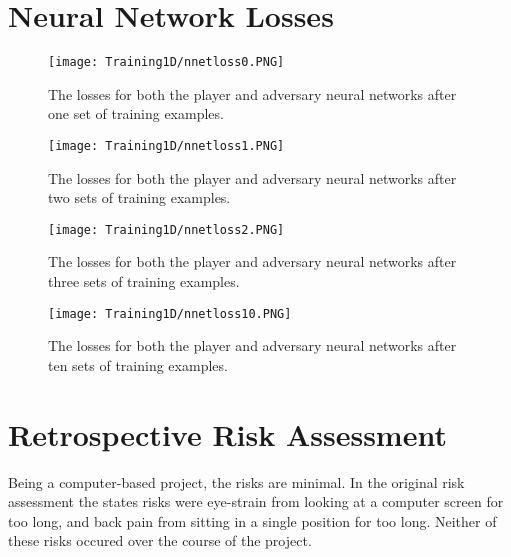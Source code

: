 \documentclass[../main.tex]{subfiles}
\begin{document}
{\section{Neural Network Losses}

\begin{figure}[h]
    \centering
    \texttt{[image: Training1D/nnetloss0.PNG]}
    \caption{The losses for both the player and adversary neural networks after one set of training examples.}
    \label{fig:nnetlosses0}
\end{figure}

\begin{figure}[h]
    \centering
    \texttt{[image: Training1D/nnetloss1.PNG]}
    \caption{The losses for both the player and adversary neural networks after two sets of training examples.}
    \label{fig:nnetlosses1}
\end{figure}

\begin{figure}[h]
    \centering
    \texttt{[image: Training1D/nnetloss2.PNG]}
    \caption{The losses for both the player and adversary neural networks after three sets of training examples.}
    \label{fig:nnetlosses2}
\end{figure}

\begin{figure}[h]
    \centering
    \texttt{[image: Training1D/nnetloss10.PNG]}
    \caption{The losses for both the player and adversary neural networks after ten sets of training examples.}
    \label{fig:nnetlosses10}
\end{figure}

\section{Retrospective Risk Assessment}

Being a computer-based project, the risks are minimal. In the original risk assessment the states risks were eye-strain from looking at a computer screen for too long, and back pain from sitting in a single position for too long. Neither of these risks occured over the course of the project.

} %
\onlyinsubfile{}
\end{document}
